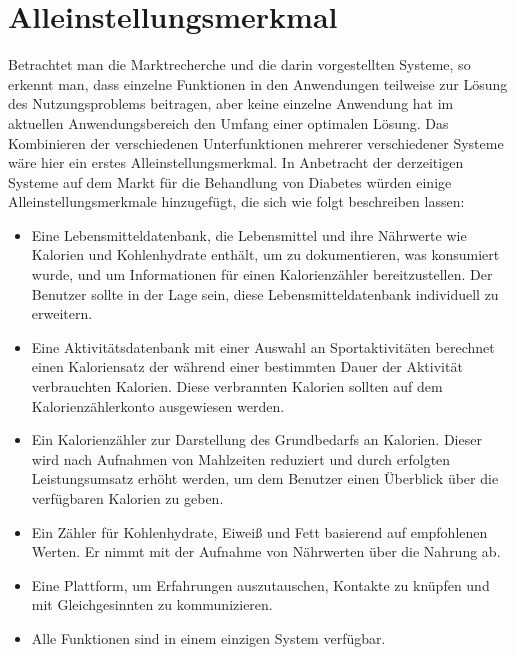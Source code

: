 \section{Alleinstellungsmerkmal}
	Betrachtet man die Marktrecherche und die darin vorgestellten Systeme, so erkennt man, dass einzelne Funktionen in den Anwendungen teilweise  zur Lösung des Nutzungsproblems beitragen, aber keine einzelne Anwendung hat im aktuellen Anwendungsbereich den Umfang einer optimalen Lösung. Das Kombinieren der verschiedenen Unterfunktionen mehrerer verschiedener Systeme wäre hier ein erstes Alleinstellungsmerkmal.\newline
	In Anbetracht der derzeitigen Systeme auf dem Markt für die Behandlung von Diabetes würden einige Alleinstellungsmerkmale hinzugefügt, die sich wie folgt beschreiben lassen:
	\begin{itemize}
	\item Eine Lebensmitteldatenbank, die Lebensmittel und ihre Nährwerte wie Kalorien und Kohlenhydrate enthält, um zu dokumentieren, was konsumiert wurde, und um Informationen für einen Kalorienzähler bereitzustellen. Der Benutzer sollte in der Lage sein, diese Lebensmitteldatenbank individuell zu erweitern. 
	\item Eine Aktivitätsdatenbank mit einer Auswahl an Sportaktivitäten berechnet einen Kaloriensatz der während einer bestimmten Dauer der Aktivität verbrauchten Kalorien. Diese verbrannten Kalorien sollten auf dem Kalorienzählerkonto ausgewiesen werden.
	\item Ein Kalorienzähler zur Darstellung des Grundbedarfs an Kalorien. Dieser wird  nach Aufnahmen von Mahlzeiten reduziert und durch erfolgten Leistungsumsatz erhöht werden, um  dem Benutzer einen Überblick über die verfügbaren Kalorien zu geben.
	\item Ein Zähler für Kohlenhydrate, Eiweiß und Fett basierend auf empfohlenen Werten. Er nimmt mit der Aufnahme von Nährwerten über die Nahrung ab. 
	\item Eine Plattform, um Erfahrungen auszutauschen, Kontakte zu knüpfen und mit Gleichgesinnten zu kommunizieren. 
	\item Alle Funktionen sind in einem einzigen System verfügbar.
	\end{itemize}